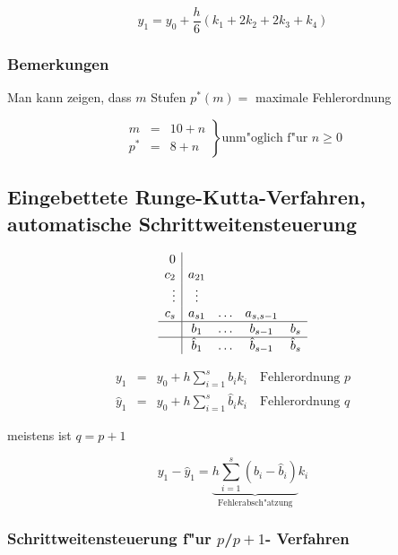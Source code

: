 \documentclass[german, 10pt, a4paper, twocolumn]{scrartcl}
\theoremstyle{definition}
\begin{document}
\begin{displaymath}
	y_1 = y_0 + \frac{h}{6} (k_1 + 2 k_2 + 2 k_3 + k_4)
\end{displaymath}

\subsubsection{Bemerkungen}

Man kann zeigen, dass $m$ Stufen $p^*(m) = $ maximale Fehlerordnung

\begin{displaymath}
	\left .
	\begin{array}{rcl}
		m &	= &	10 + n\\
		p^* &	= &	8 + n
	\end{array}
	\right \}
	\text{unm"oglich f"ur } n \geq 0
\end{displaymath}

\subsection{Eingebettete Runge-Kutta-Verfahren, automatische Schrittweitensteuerung}

\begin{displaymath}
	\begin{array}{r|cccc}
		0 \\
		c_2 &		a_{21}\\
		\vdots &	\vdots\\
		c_s &		a_{s1} &	\ldots &	a_{s,s-1}\\ \hline
		&		b_1 &		\ldots &	b_{s-1} &		b_s\\ \hline
		&		\hat{b}_1 &	\ldots &	\hat{b}_{s-1} &		\hat{b}_s
	\end{array}
\end{displaymath}

\begin{eqnarray*}
	y_1 &		= &	y_0 + h \sum^s_{i=1} b_i k_i \quad		\text{Fehlerordnung } p\\
	\hat{y}_1 &	= &	y_0 + h \sum^s_{i=1} \hat{b}_i k_i \quad	\text{Fehlerordnung } q
\end{eqnarray*}

meistens ist $q=p + 1$

\begin{displaymath}
	y_1 - \hat{y}_1 = \underbrace{h \sum^s_{i=1} (b_i - \hat{b}_i)}_{\text{Fehlerabsch"atzung}} k_i
\end{displaymath}

\subsubsection{Schrittweitensteuerung f"ur $p$/$p+1$- Verfahren}
\end{document}
